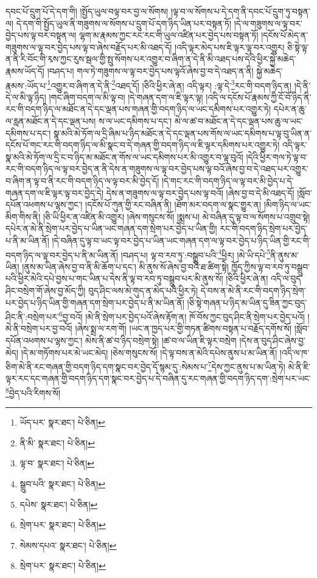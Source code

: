 དབང་པོ་དྲུག་པོ་དེ་དག་གི། །སྤྱོད་ཡུལ་བལྟ་བར་བྱ་ལ་སོགས། །ལྟ་བ་ལ་སོགས་པ་དེ་དག་ནི་དབང་པོ་དྲུག་ཏུ་བསྟན་ལ། དེ་དག་གི་སྤྱོད་ཡུལ་ནི་གཟུགས་ལ་སོགས་པ་དྲུག་པོ་དག་ཉིད་ཡིན་པར་བསྟན་ཏོ། །དེ་ལ་གཟུགས་ལ་ལྟ་བར་བྱེད་པས་ལྟ་བར་བསྟན་ལ། ལྷག་མ་རྣམས་ཀྱང་རང་རང་གི་ཡུལ་འཛིན་པར་བྱེད་པས་བསྟན་ཏོ། །དངོས་པོ་མེད་ན་གཟུགས་ལ་ལྟ་བར་བྱེད་པས་ལྟ་བ་ཞེས་བརྗོད་པར་མི་འཐད་དོ། །འདི་ལྟར་མེད་པས་ཇི་ལྟར་ལྟ་བར་འགྱུར། ཅི་སྟེ་ལྟ་ན་ནི་རི་བོང་གི་རྭས་ཀྱང་རུས་སྦལ་གྱི་སྤུ་སོགས་པར་འགྱུར་བ་ཞིག་ན་དེ་ནི་མི་འཐད་པས་དེའི་ཕྱིར་སྐྱེ་མཆེད་རྣམས་ཡོད་དོ། །བཤད་པ། གལ་ཏེ་གཟུགས་ལ་ལྟ་བར་བྱེད་པས་ལྟའོ་ཞེས་བྱ་བ་དེ་འཐད་ན་ནི། སྐྱེ་མཆེད་རྣམས་:ཡོད་པ་\footnote{ཡོད་པར་  སྣར་ཐང་།  པེ་ཅིན། }འགྱུར་བ་ཞིག་ན་དེ་ནི་\footnote{ནི་མི་  སྣར་ཐང་།  པེ་ཅིན། }འཐད་དོ། །ཅིའི་ཕྱིར་ཞེ་ན། འདི་ལྟར། :ལྟ་དེ་\footnote{ལྟ་བ་  སྣར་ཐང་།  པེ་ཅིན། }རང་གི་བདག་ཉིད་ན། །དེ་ནི་དེ་ལ་མི་ལྟ་ཉིད། །གང་ཞིག་བདག་ལ་མི་ལྟ་བ། །དེ་གཞན་དག་ལ་ཇི་ལྟར་ལྟ། །འདི་ལ་དངོས་པོ་རྣམས་ཀྱི་ངོ་བོ་ཉིད་ནི་རང་གི་བདག་ཉིད་ལ་མཐོང་ན་དེ་དང་ལྡན་པས་གཞན་གྱི་བདག་ཉིད་ལ་ཡང་དམིགས་པར་འགྱུར་ཏེ། དཔེར་ན་ཆུ་ལ་རླན་མཐོང་ན་དེ་དང་ལྡན་པས། ས་ལ་ཡང་དམིགས་པ་དང་། མེ་ལ་ཚ་བ་མཐོང་ན་དེ་དང་ལྡན་པས་ཆུ་ལ་ཡང་དམིགས་པ་དང་། སྣ་མའི་མེ་ཏོག་ལ་དྲི་ཞིམ་པ་ཉིད་མཐོང་ན་དེ་དང་ལྡན་པས་གོས་ལ་ཡང་དམིགས་པ་ལྟ་བུ་ཡིན་ན་དངོས་པོ་གང་རང་གི་བདག་ཉིད་ལ་མི་སྣང་བ་དེ་གཞན་གྱི་བདག་ཉིད་ལ་ཇི་ལྟར་དམིགས་པར་འགྱུར་ཏེ། འདི་ལྟར་སྣ་མའི་མེ་ཏོག་ལ་དྲི་ང་བ་ཉིད་མ་མཐོང་ན་གོས་ལ་ཡང་དམིགས་པར་མི་འགྱུར་བ་ལྟ་བུའོ། །དེའི་ཕྱིར་གལ་ཏེ་ལྟ་བ་རང་གི་བདག་ཉིད་ལ་ལྟ་བར་བྱེད་ན་ནི་དེས་ན་གཟུགས་ལ་ལྟ་བར་བྱེད་པས་ལྟ་བའོ་ཞེས་བྱ་བ་དེ་འཐད་པར་འགྱུར་བ་ཞིག་ན་ལྟ་བ་ནི་རང་གི་བདག་ཉིད་ལ་ལྟ་བར་མི་བྱེད་དོ། །དེ་གང་རང་གི་བདག་ཉིད་ལ་ལྟ་བར་མི་བྱེད་པ་དེ་གཞན་དག་ལ་ཇི་ལྟར་ལྟ་བར་བྱེད་དེ། དེས་ན་གཟུགས་ལ་ལྟ་བར་བྱེད་པས་ལྟ་བའོ། །ཞེས་བྱ་བ་དེ་མི་འཐད་དོ། །སློབ་དཔོན་འཕགས་པ་ལྷས་ཀྱང་། །དངོས་པོ་ཀུན་གྱི་རང་བཞིན་ནི། །ཐོག་མར་བདག་ལ་སྣང་གྱུར་ན། །མིག་ཉིད་ལ་ཡང་མིག་གིས་ནི། །ཅི་ཡི་ཕྱིར་ན་འཛིན་མི་འགྱུར། །ཞེས་གསུངས་སོ། །སྨྲས་པ། མེ་བཞིན་དུ་ལྟ་བ་ལ་སོགས་པ་འགྲུབ་སྟེ། དཔེར་ན་མེ་ནི་སྲེག་པར་བྱེད་པ་ཡིན་ཡང་གཞན་དག་སྲེག་པར་བྱེད་པ་ཡིན་གྱི། རང་གི་བདག་ཉིད་སྲེག་པར་བྱེད་པ་ནི་མ་ཡིན་ནོ། །དེ་བཞིན་དུ་ལྟ་བ་ཡང་ལྟ་བར་བྱེད་པ་ཡིན་ཡང་གཞན་དག་ལ་ལྟ་བར་བྱེད་པ་ཉིད་ཡིན་གྱི་རང་གི་བདག་ཉིད་ལ་ལྟ་བར་བྱེད་པ་ནི་མ་ཡིན་ནོ། །བཤད་པ། ལྟ་བ་རབ་ཏུ་:བསྒྲུབ་པའི་\footnote{སྒྲུབ་པའི་  སྣར་ཐང་།  པེ་ཅིན། }ཕྱིར། །མེ་ཡི་དཔེ་\footnote{དཔེས་  སྣར་ཐང་།  པེ་ཅིན། }ནི་ནུས་མ་ཡིན། །ནུས་མ་ཡིན་ཞེས་བྱ་བ་ནི་མི་ཆོག་པ་དང་། མི་ནུས་སོ་ཞེས་བྱ་བའི་ཐ་ཚིག་སྟེ། ཁྱོད་ཀྱིས་ལྟ་བ་རབ་ཏུ་བསྒྲུབ་པའི་ཕྱིར་མེའི་དཔེ་བྱས་པ་གང་ཡིན་པ་དེས་ནི་ལྟ་བ་རབ་ཏུ་བསྒྲུབ་པར་མི་ནུས་སོ། །ཅིའི་ཕྱིར་ཞེ་ན། འདི་ལ་བུད་ཤིང་བསྲེག་གོ་ཞེས་བྱ་མོད་ཀྱི། བུད་ཤིང་ལས་མེ་གུད་ན་མེད་པའི་ཕྱིར་ཏེ། དེ་བས་ན་མེ་ནི་རང་གི་བདག་ཉིད་སྲེག་པར་བྱེད་པ་ཉིད་ཡིན་གྱི་གཞན་དག་སྲེག་པར་བྱེད་པ་ནི་མ་ཡིན་ནོ། །ཅི་སྟེ་གཞན་པ་ཉིད་མ་ཡིན་དུ་ཟིན་ཀྱང་བུད་ཤིང་ནི་:བསྲེག་པར་\footnote{སྲེག་པར་  སྣར་ཐང་།  པེ་ཅིན། }བྱ་བའོ། །མེ་ནི་སྲེག་པར་བྱེད་པའོ་ཞེས་རྟོག་ན། ཁོ་བོས་ཀྱང་བུད་ཤིང་ནི་སྲེག་པར་བྱེད་པའོ། །མེ་ནི་བསྲེག་པར་བྱ་བའོ། །ཞེས་སྨྲ་ལ་རག་གོ། །ཡང་ན་ཁྱད་པར་གྱི་གཏན་ཚིགས་བསྟན་པ་བརྗོད་དགོས་སོ། །སློབ་དཔོན་འཕགས་པ་ལྷས་ཀྱང་། མེས་ནི་ཚ་བ་ཉིད་བསྲེག་སྟེ། །ཚ་བ་ལ་ཡིན་ཇི་ལྟར་བསྲེག །དེས་ན་བུད་ཤིང་ཞེས་བྱ་མེད། །དེ་མ་གཏོགས་པར་མེ་ཡང་མེད། །ཅེས་གསུངས་སོ། །དེ་ལྟ་བས་ན་མེའི་དཔེས་ནུས་པ་མ་ཡིན་ནོ། །འདི་ལ་ཁ་ཅིག་མེ་ནི་རང་གཞན་གྱི་བདག་ཉིད་དག་སྣང་བར་བྱེད་དོ་སྙམ་དུ་:སེམས་པ་\footnote{སེམས་དཔའ་  སྣར་ཐང་།  པེ་ཅིན། }དེས་ཀྱང་ནུས་པ་མ་ཡིན་ཏེ། མེ་ནི་ཇི་ལྟར་རང་དང་གཞན་གྱི་བདག་ཉིད་དག་སྣང་བར་བྱེད་པ་དེ་བཞིན་དུ་རང་གཞན་གྱི་བདག་ཉིད་དག་:སྲེག་པར་ཡང་\footnote{སྲེག་པར་  སྣར་ཐང་།  པེ་ཅིན། }བྱེད་པའི་རིགས་སོ། 